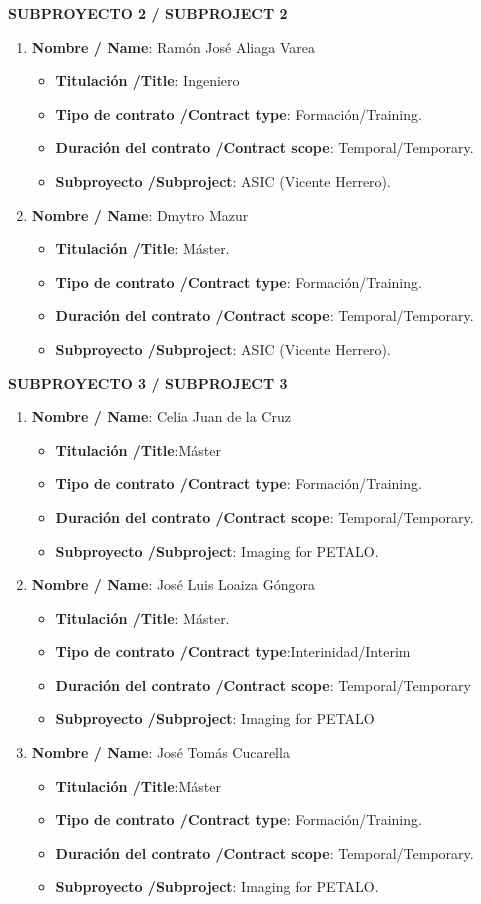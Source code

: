 \noindent\textbf{SUBPROYECTO 2 / SUBPROJECT 2}
\begin{enumerate}
\item {\bf Nombre / Name}: Ramón José Aliaga Varea
\begin{itemize}
\item {\bf Titulación /Title}:  Ingeniero
\item {\bf Tipo de contrato /Contract type}: Formación/Training. 
\item {\bf Duración del contrato /Contract scope}: Temporal/Temporary. 
\item {\bf Subproyecto /Subproject}: ASIC (Vicente Herrero). 
\end{itemize}
\item {\bf Nombre / Name}: Dmytro Mazur
\begin{itemize}
\item {\bf Titulación /Title}: Máster. 
\item {\bf Tipo de contrato /Contract type}: Formación/Training. 
\item {\bf Duración del contrato /Contract scope}: Temporal/Temporary. 
\item {\bf Subproyecto /Subproject}: ASIC (Vicente Herrero). 
\end{itemize}
\end{enumerate}

\noindent\textbf{SUBPROYECTO 3 / SUBPROJECT 3}
\begin{enumerate}
 \item {\bf Nombre / Name}: Celia Juan de la Cruz
 \begin{itemize}
 \item {\bf Titulación /Title}:Máster
 \item {\bf Tipo de contrato /Contract type}: Formación/Training.
 \item {\bf Duración del contrato /Contract scope}: Temporal/Temporary.
 \item {\bf Subproyecto /Subproject}: Imaging for PETALO.
 \end{itemize}
 \item {\bf Nombre / Name}: José Luis Loaiza Góngora
 \begin{itemize}
 \item {\bf Titulación /Title}: Máster.
 \item {\bf Tipo de contrato /Contract type}:Interinidad/Interim
 \item {\bf Duración del contrato /Contract scope}: Temporal/Temporary
\item {\bf Subproyecto /Subproject}: Imaging for PETALO
 \end{itemize}
 \item {\bf Nombre / Name}: José Tomás Cucarella
 \begin{itemize}
 \item {\bf Titulación /Title}:Máster
 \item {\bf Tipo de contrato /Contract type}: Formación/Training.
 \item {\bf Duración del contrato /Contract scope}: Temporal/Temporary.
 \item {\bf Subproyecto /Subproject}: Imaging for PETALO.
 \end{itemize}
 \end{enumerate}
